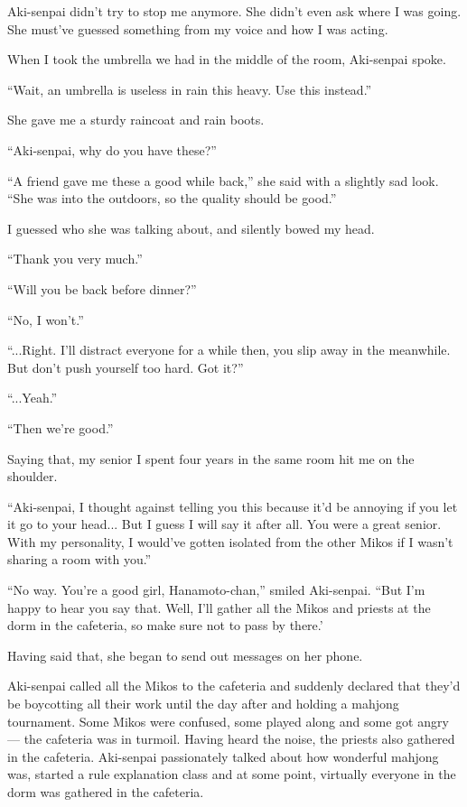Aki-senpai didn't try to stop me anymore. She didn't even ask where I was going. She must've guessed something from my voice and how I was acting.

When I took the umbrella we had in the middle of the room, Aki-senpai spoke.

``Wait, an umbrella is useless in rain this heavy. Use this instead.''

She gave me a sturdy raincoat and rain boots.

``Aki-senpai, why do you have these?''

``A friend gave me these a good while back,'' she said with a slightly sad look. ``She was into the outdoors, so the quality should be good.''

I guessed who she was talking about, and silently bowed my head.

``Thank you very much.''

``Will you be back before dinner?''

``No, I won't.''

``...Right. I'll distract everyone for a while then, you slip away in the meanwhile. But don't push yourself too hard. Got it?''

``...Yeah.''

``Then we're good.''

Saying that, my senior I spent four years in the same room hit me on the shoulder.

``Aki-senpai, I thought against telling you this because it'd be annoying if you let it go to your head... But I guess I will say it after all. You were a great senior. With my personality, I would've gotten isolated from the other Mikos if I wasn't sharing a room with you.''

``No way. You're a good girl, Hanamoto-chan,'' smiled Aki-senpai. ``But I'm happy to hear you say that. Well, I'll gather all the Mikos and priests at the dorm in the cafeteria, so make sure not to pass by there.'

Having said that, she began to send out messages on her phone.

Aki-senpai called all the Mikos to the cafeteria and suddenly declared that they'd be boycotting all their work until the day after and holding a mahjong tournament. Some Mikos were confused, some played along and some got angry --- the cafeteria was in turmoil. Having heard the noise, the priests also gathered in the cafeteria. Aki-senpai passionately talked about how wonderful mahjong was, started a rule explanation class and at some point, virtually everyone in the dorm was gathered in the cafeteria.

